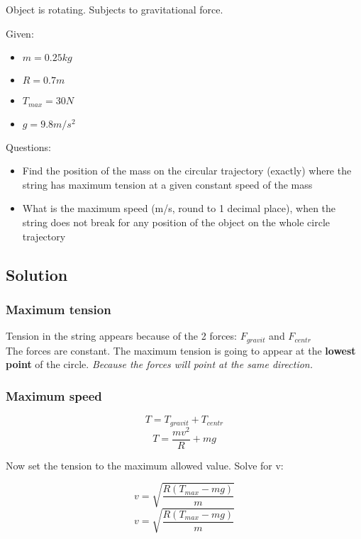 
Object is rotating. Subjects to gravitational force.


\bigbreak Given: 
\begin{itemize}
    \item $  m  = 0.25kg $
    \item $ R = 0.7m $
    \item $ T_{max} = 30N $
    \item $ g = 9.8m/s^2 $
\end{itemize}


\bigbreak Questions:
\begin{itemize}
    \item Find the position of the mass on the circular trajectory (exactly) where the string has
    maximum tension at a given constant speed of the mass
    \item What is the maximum speed (m/s, round to 1 decimal place), when the string does not
    break for any position of the object on the whole circle trajectory
\end{itemize}

\subsection*{Solution}
\subsubsection*{Maximum tension}
Tension in the string appears because of the 2 forces: $F_{gravit}$ and $F_{centr}$ \\
The forces are constant. The maximum tension is going to appear at the \textbf{lowest point} of the circle.
\textit{Because the forces will point at the same direction.}


\subsubsection*{Maximum speed}
$$ T = T_{gravit} + T_{centr} $$
$$ T = \frac{mv^2}{R} + mg $$

Now set the tension to the maximum allowed value. Solve for v:

$$  v =  \sqrt{\frac{R(T_{max} - mg)}{m}} $$
$$  v =  \sqrt{\frac{R(T_{max} - mg)}{m}} $$


